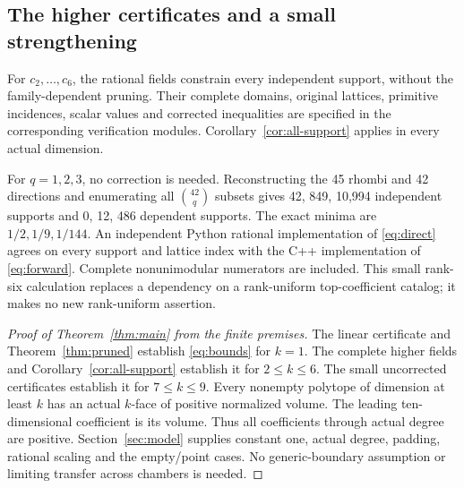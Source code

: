 \documentclass[11pt]{article}
\theoremstyle{definition}\newtheorem{definition}[theorem]{Definition}
\theoremstyle{remark}\newtheorem{remark}[theorem]{Remark}
\begin{document}
\subsection{The higher certificates and a small strengthening}
For \(c_2,\ldots,c_6\), the rational fields constrain every independent
support, without the family-dependent pruning. Their complete domains,
original lattices, primitive incidences, scalar values and corrected
inequalities are specified in the corresponding verification modules.
Corollary~\ref{cor:all-support} applies in every actual dimension.

For \(q=1,2,3\), no correction is needed. Reconstructing the 45 rhombi
and 42 directions and enumerating all \(\binom{42}{q}\) subsets gives
42, 849, 10,994 independent supports and 0, 12, 486 dependent supports.
The exact minima are \(1/2,1/9,1/144\). An independent Python rational
implementation of \eqref{eq:direct} agrees on every support and lattice
index with the C++ implementation of \eqref{eq:forward}. Complete
nonunimodular numerators are included. This small rank-six calculation
replaces a dependency on a rank-uniform top-coefficient catalog; it makes
no new rank-uniform assertion.

\begin{proof}[Proof of Theorem~\ref{thm:main} from the finite premises]
The linear certificate and Theorem~\ref{thm:pruned} establish
\eqref{eq:bounds} for \(k=1\). The complete higher fields and
Corollary~\ref{cor:all-support} establish it for \(2\leq k\leq6\).
The small uncorrected certificates establish it for \(7\leq k\leq9\).
Every nonempty polytope of dimension at least \(k\) has an actual
\(k\)-face of positive normalized volume. The leading ten-dimensional
coefficient is its volume. Thus all coefficients through actual degree
are positive. Section~\ref{sec:model} supplies constant one, actual degree,
padding, rational scaling and the empty/point cases. No generic-boundary
assumption or limiting transfer across chambers is needed.
\end{proof}
\end{document}
